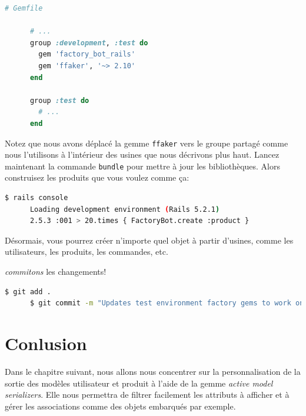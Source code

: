 \documentclass[]{report}
\begin{document}
    \begin{scriptsize}
      \begin{lstlisting}[language=ruby]
      # Gemfile

      # ...
      group :development, :test do
        gem 'factory_bot_rails'
        gem 'ffaker', '~> 2.10'
      end

      group :test do
        # ...
      end
      \end{lstlisting}
    \end{scriptsize}

    Notez que nous avons déplacé la gemme \verb|ffaker| vers le groupe partagé comme nous l'utilisons à l'intérieur des usines que nous décrivons plus haut. Lancez maintenant la commande \verb|bundle| pour mettre à jour les bibliothèques. Alors construisez les produits que vous voulez comme ça:

    \begin{scriptsize}
      \begin{lstlisting}[language=bash]
      $ rails console
      Loading development environment (Rails 5.2.1)
      2.5.3 :001 > 20.times { FactoryBot.create :product }
      \end{lstlisting}
    \end{scriptsize}

    Désormais, vous pourrez créer n'importe quel objet à partir d'usines, comme les utilisateurs, les produits, les commandes, etc.

    \textit{commitons} les changements!

    \begin{scriptsize}
      \begin{lstlisting}[language=bash]
      $ git add .
      $ git commit -m "Updates test environment factory gems to work on development"
      \end{lstlisting}
    \end{scriptsize}

  \section{Conlusion}

    Dans le chapitre suivant, nous allons nous concentrer sur la personnalisation de la sortie des modèles utilisateur et produit à l'aide de la gemme \textit{active model serializers}. Elle nous permettra de filtrer facilement les attributs à afficher et à gérer les associations comme des objets embarqués par exemple.
\end{document}
